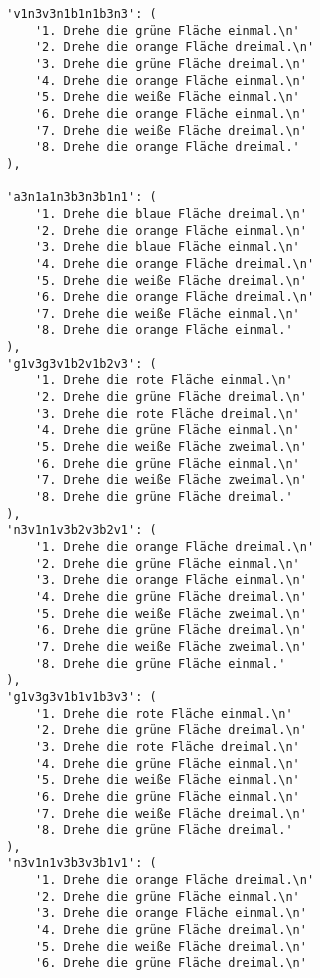\begin{lstlisting}
        'v1n3v3n1b1n1b3n3': (
            '1. Drehe die grüne Fläche einmal.\n'
            '2. Drehe die orange Fläche dreimal.\n'
            '3. Drehe die grüne Fläche dreimal.\n'
            '4. Drehe die orange Fläche einmal.\n'
            '5. Drehe die weiße Fläche einmal.\n'
            '6. Drehe die orange Fläche einmal.\n'
            '7. Drehe die weiße Fläche dreimal.\n'
            '8. Drehe die orange Fläche dreimal.'
        ),

        'a3n1a1n3b3n3b1n1': (
            '1. Drehe die blaue Fläche dreimal.\n'
            '2. Drehe die orange Fläche einmal.\n'
            '3. Drehe die blaue Fläche einmal.\n'
            '4. Drehe die orange Fläche dreimal.\n'
            '5. Drehe die weiße Fläche dreimal.\n'
            '6. Drehe die orange Fläche dreimal.\n'
            '7. Drehe die weiße Fläche einmal.\n'
            '8. Drehe die orange Fläche einmal.'
        ),
        'g1v3g3v1b2v1b2v3': (
            '1. Drehe die rote Fläche einmal.\n'
            '2. Drehe die grüne Fläche dreimal.\n'
            '3. Drehe die rote Fläche dreimal.\n'
            '4. Drehe die grüne Fläche einmal.\n'
            '5. Drehe die weiße Fläche zweimal.\n'
            '6. Drehe die grüne Fläche einmal.\n'
            '7. Drehe die weiße Fläche zweimal.\n'
            '8. Drehe die grüne Fläche dreimal.'
        ),
        'n3v1n1v3b2v3b2v1': (
            '1. Drehe die orange Fläche dreimal.\n'
            '2. Drehe die grüne Fläche einmal.\n'
            '3. Drehe die orange Fläche einmal.\n'
            '4. Drehe die grüne Fläche dreimal.\n'
            '5. Drehe die weiße Fläche zweimal.\n'
            '6. Drehe die grüne Fläche dreimal.\n'
            '7. Drehe die weiße Fläche zweimal.\n'
            '8. Drehe die grüne Fläche einmal.'
        ),
        'g1v3g3v1b1v1b3v3': (
            '1. Drehe die rote Fläche einmal.\n'
            '2. Drehe die grüne Fläche dreimal.\n'
            '3. Drehe die rote Fläche dreimal.\n'
            '4. Drehe die grüne Fläche einmal.\n'
            '5. Drehe die weiße Fläche einmal.\n'
            '6. Drehe die grüne Fläche einmal.\n'
            '7. Drehe die weiße Fläche dreimal.\n'
            '8. Drehe die grüne Fläche dreimal.'
        ),
        'n3v1n1v3b3v3b1v1': (
            '1. Drehe die orange Fläche dreimal.\n'
            '2. Drehe die grüne Fläche einmal.\n'
            '3. Drehe die orange Fläche einmal.\n'
            '4. Drehe die grüne Fläche dreimal.\n'
            '5. Drehe die weiße Fläche dreimal.\n'
            '6. Drehe die grüne Fläche dreimal.\n'

\end{lstlisting}
